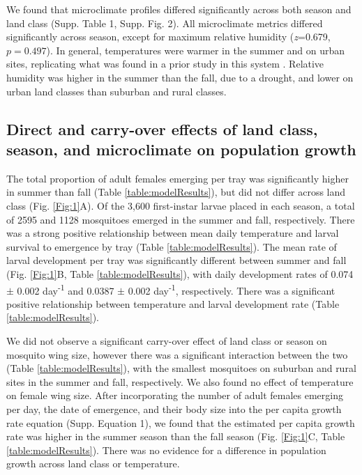 \documentclass[12pt]{article}
\begin{document}
We found that microclimate profiles differed significantly across both season and land class (Supp. Table 1, Supp. Fig. 2). All microclimate metrics differed significantly across season, except for maximum relative humidity (\textit{z}=0.679, $p=0.497$). In general, temperatures were warmer in the summer and on urban sites, replicating what was found in a prior study in this system \citep{murdock2017}. Relative humidity was higher in the summer than the fall, due to a drought, and lower on urban land classes than suburban and rural classes.

\subsection{Direct and carry-over effects of land class, season, and microclimate on population growth}

The total proportion of adult females emerging per tray was significantly higher in summer than fall (Table \ref{table:modelResults}), but did not differ across land class (Fig. \ref{Fig:1}A). Of the 3,600 first-instar larvae placed in each season, a total of 2595 and 1128 mosquitoes emerged in the summer and fall, respectively. There was a strong positive relationship between mean daily temperature and larval survival to emergence by tray (Table \ref{table:modelResults}). The mean rate of larval development per tray was significantly different between summer and fall (Fig. \ref{Fig:1}B, Table \ref{table:modelResults}), with daily development rates of 0.074 $\pm$ 0.002 day\textsuperscript{-1} and 0.0387 $\pm$ 0.002 day\textsuperscript{-1}, respectively. There was a significant positive relationship between temperature and larval development rate (Table \ref{table:modelResults}).

We did not observe a significant carry-over effect of land class or season on mosquito wing size, however there was a significant interaction between the two (Table \ref{table:modelResults}), with the smallest mosquitoes on suburban and rural sites in the summer and fall, respectively. We also found no effect of temperature on female wing size. After incorporating the number of adult females emerging per day, the date of emergence, and their body size into the per capita growth rate equation (Supp. Equation 1), we found that the estimated per capita growth rate was higher in the summer season than the fall season (Fig. \ref{Fig:1}C, Table \ref{table:modelResults}). There was no evidence for a difference in population growth across land class or temperature.
\end{document}
